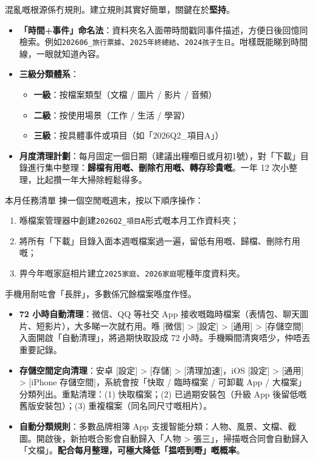 
混亂嘅根源係冇規則。建立規則其實好簡單，關鍵在於\textbf{堅持}。

\begin{itemize}
  \item \textbf{「時間+事件」命名法}：資料夾名入面帶時間戳同事件描述，方便日後回憶同檢索。例如\texttt{202606\_旅行票據}、\texttt{2025年終總結}、\texttt{2024孩子生日}。咁樣既能睇到時間線，一眼就知道內容。
  \item \textbf{三級分類體系}：
  \begin{itemize}
    \item \textbf{一級}：按檔案類型（文檔 / 圖片 / 影片 / 音頻）
    \item \textbf{二級}：按使用場景（工作 / 生活 / 學習）
    \item \textbf{三級}：按具體事件或項目（如「2026Q2\_項目A」）
  \end{itemize}
  \item \textbf{月度清理計劃}：每月固定一個日期（建議出糧嗰日或月初1號），對「下載」目錄進行集中整理：\textbf{歸檔有用嘅、刪除冇用嘅、轉存珍貴嘅}。一年 12 次小整理，比起攢一年大掃除輕鬆得多。
\end{itemize}

\begin{tcbpractice}{本月任務清單}
揀一個空閒嘅週末，按以下順序操作：

\begin{enumerate}
  \item 喺檔案管理器中創建\texttt{2026Q2\_項目A}形式嘅本月工作資料夾；
  \item 將所有「下載」目錄入面本週嘅檔案過一遍，留低有用嘅、歸檔、刪除冇用嘅；
  \item 畀今年嘅家庭相片建立\texttt{2025家庭}、\texttt{2026家庭}呢種年度資料夾。
\end{enumerate}

\end{tcbpractice}


手機用耐咗會「長胖」，多數係冗餘檔案喺度作怪。

\begin{itemize}
  \item \textbf{72 小時自動清理}：微信、QQ 等社交 App 接收嘅臨時檔案（表情包、聊天圖片、短影片），大多睇一次就冇用。喺 [微信] > [設定] > [通用] > [存儲空間] 入面開啟「自動清理」，將過期快取設成 72 小時。手機瞬間清爽唔少，仲唔丟重要記錄。
  \item \textbf{存儲空間定向清理}：安卓 [設定] > [存儲] > [清理加速]，iOS [設定] > [通用] > [iPhone 存儲空間]，系統會按「快取 / 臨時檔案 / 可卸載 App / 大檔案」分類列出。重點清理：(1) 快取檔案；(2) 已過期安裝包（升級 App 後留低嘅舊版安裝包）；(3) 重複檔案（同名同尺寸嘅相片）。
  \item \textbf{自動分類規則}：多數品牌相簿 App 支援智能分類：人物、風景、文檔、截圖。開啟後，新拍嘅合影會自動歸入「人物 > 張三」，掃描嘅合同會自動歸入「文檔」。\textbf{配合每月整理，可極大降低「揾唔到嘢」嘅概率}。
\end{itemize}

